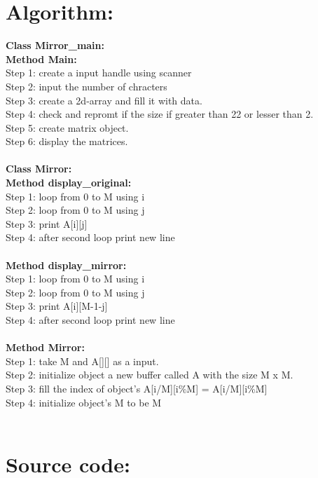 \section*{Algorithm:}
\textbf{\color{javapurple}Class Mirror\_main:}\\
\textbf{Method Main:}\\
Step 1: create a input handle using scanner\\
Step 2: input the number of chracters\\
Step 3: create a 2d-array and fill it with data.\\ 
Step 4: check and repromt if the size if greater than 22 or lesser than 2.\\
Step 5: create matrix object.\\
Step 6: display the matrices.\\\\
\textbf{\color{javapurple}Class Mirror:}\\
\textbf{Method display\_original:}\\
Step 1: loop from 0 to M using i\\
Step 2: loop from 0 to M using j\\
Step 3: print A[i][j]\\
Step 4: after second loop print new line\\\\
\textbf{Method display\_mirror:}\\
Step 1: loop from 0 to M using i\\
Step 2: loop from 0 to M using j\\
Step 3: print A[i][M-1-j] \\
Step 4: after second loop print new line\\\\
\textbf{Method Mirror:}\\
Step 1: take M and A[][] as a input.\\
Step 2: initialize object a new buffer called A with the size M x M.\\ 
Step 3: fill the index of object's A[i/M][i\%M] = A[i/M][i\%M]\\
Step 4: initialize object's M to be M\\\\

\section*{Source code:}



